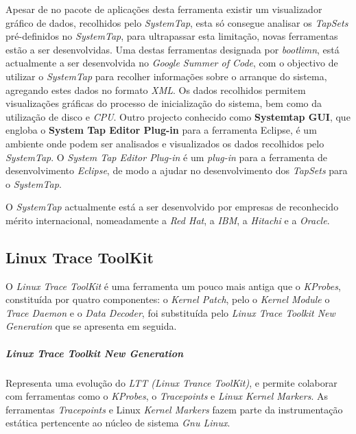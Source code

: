 Apesar de no pacote de aplicações desta ferramenta existir um visualizador gráfico de dados, recolhidos pelo \textit{SystemTap}, esta só consegue analisar os \textit{TapSets} pré-definidos no \textit{SystemTap}, para ultrapassar esta limitação, novas ferramentas estão a ser desenvolvidas.
Uma destas ferramentas designada por \textit{bootlimn}, está actualmente a ser desenvolvida no \textit{Google Summer of Code}, com o objectivo de utilizar o \textit{SystemTap} para recolher informações sobre o arranque do sistema, agregando estes dados no formato \textit{XML}.
Os dados recolhidos permitem visualizações gráficas do processo de inicialização do sistema, bem como da utilização de disco e \textit{CPU}.
Outro projecto conhecido como \textbf{Systemtap GUI}, que engloba o \textbf{System Tap Editor Plug-in} para a ferramenta Eclipse, é um ambiente onde podem ser analisados e visualizados os dados recolhidos pelo \textit{SystemTap}.
O \textit{System Tap Editor Plug-in} é um \textit{plug-in} para a ferramenta de desenvolvimento \textit{Eclipse}, de modo a ajudar no desenvolvimento dos \textit{TapSets} para o \textit{SystemTap}.

O \textit{SystemTap} actualmente está a ser desenvolvido por empresas de reconhecido mérito internacional, nomeadamente a \textit{Red Hat}, a \textit{IBM}, a \textit{Hitachi} e a \textit{Oracle}.

\subsection{Linux Trace ToolKit}\label{cap:linux_trace_toolkit_overview}

O \textit{Linux Trace ToolKit} é uma ferramenta um pouco mais antiga que o \textit{KProbes}, constituída por quatro componentes: o \textit{Kernel Patch}, pelo o \textit{Kernel Module} o \textit{Trace Daemon} e o \textit{Data Decoder}, foi substituída pelo \textit{Linux Trace Toolkit New Generation} que se apresenta em seguida.

\subparagraph{Linux Trace Toolkit New Generation}\label{cap:lttng_overview}


Representa uma evolução do \textit{LTT (Linux Trance ToolKit)}, e permite colaborar com ferramentas como o \textit{KProbes}, o \textit{Tracepoints}\cite{Mathieu2009} e \textit{Linux Kernel Markers}\cite{Mathieu2009}.
As ferramentas \textit{Tracepoints} e Linux \textit{Kernel Markers} fazem parte da instrumentação estática pertencente ao núcleo de sistema \textit{Gnu Linux}.

